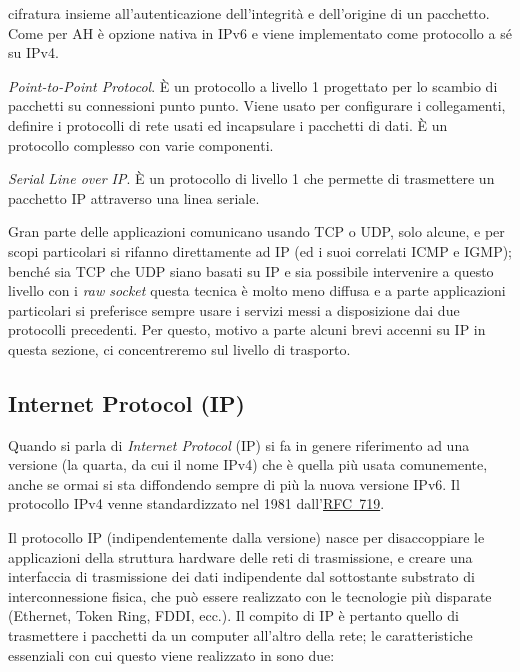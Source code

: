 \begin{basedescript}{\desclabelwidth{1.7cm}\desclabelstyle{\nextlinelabel}}
  cifratura insieme all'autenticazione dell'integrità e dell'origine di un
  pacchetto. Come per AH è opzione nativa in IPv6 e viene implementato come
  protocollo a sé su IPv4.
\item[\textsl{PPP}] \textit{Point-to-Point Protocol}. È un protocollo a
  livello 1 progettato per lo scambio di pacchetti su connessioni punto punto.
  Viene usato per configurare i collegamenti, definire i protocolli di rete
  usati ed incapsulare i pacchetti di dati. È un protocollo complesso con
  varie componenti.
\item[\textsl{SLIP}] \textit{Serial Line over IP}. È un protocollo di livello
  1 che permette di trasmettere un pacchetto IP attraverso una linea seriale.
\end{basedescript}

Gran parte delle applicazioni comunicano usando TCP o UDP, solo alcune, e per
scopi particolari si rifanno direttamente ad IP (ed i suoi correlati ICMP e
IGMP); benché sia TCP che UDP siano basati su IP e sia possibile intervenire a
questo livello con i \textit{raw socket} questa tecnica è molto meno diffusa e
a parte applicazioni particolari si preferisce sempre usare i servizi messi a
disposizione dai due protocolli precedenti.  Per questo, motivo a parte alcuni
brevi accenni su IP in questa sezione, ci concentreremo sul livello di
trasporto.

\subsection{Internet Protocol (IP)}
\label{sec:net_ip}

Quando si parla di \textit{Internet Protocol} (IP) si fa in genere riferimento
ad una versione (la quarta, da cui il nome IPv4) che è quella più usata
comunemente, anche se ormai si sta diffondendo sempre di più la nuova versione
IPv6. Il protocollo IPv4 venne standardizzato nel 1981
dall'\href{http://www.ietf.org/rfc/rfc0719.txt}{RFC~719}.

Il protocollo IP (indipendentemente dalla versione) nasce per disaccoppiare le
applicazioni della struttura hardware delle reti di trasmissione, e creare una
interfaccia di trasmissione dei dati indipendente dal sottostante substrato di
interconnessione fisica, che può essere realizzato con le tecnologie più
disparate (Ethernet, Token Ring, FDDI, ecc.).  Il compito di IP è pertanto
quello di trasmettere i pacchetti da un computer all'altro della rete; le
caratteristiche essenziali con cui questo viene realizzato in sono due:


